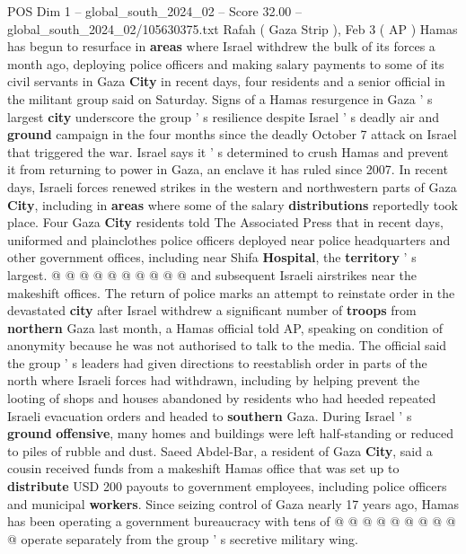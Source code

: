 \begin{textsample}{POS Dim 1 – global\_south\_2024\_02 – Score 32.00 – global\_south\_2024\_02/105630375.txt}  \label{ex:f1_pos_028}
Rafah ( Gaza Strip ), Feb 3 ( AP ) Hamas has begun to resurface in \textbf{areas} where Israel withdrew the bulk of its forces a month ago, deploying police officers and making salary payments to some of its civil servants in Gaza \textbf{City} in recent days, four residents and a senior official in the militant group said on Saturday.
Signs of a Hamas resurgence in Gaza ' s largest \textbf{city} underscore the group ' s resilience despite Israel ' s deadly air and \textbf{ground} campaign in the four months since the deadly October 7 attack on Israel that triggered the war.
Israel says it ' s determined to crush Hamas and prevent it from returning to power in Gaza, an enclave it has ruled since 2007.
In recent days, Israeli forces renewed strikes in the western and northwestern parts of Gaza \textbf{City}, including in \textbf{areas} where some of the salary \textbf{distributions} reportedly took place.
Four Gaza \textbf{City} residents told The Associated Press that in recent days, uniformed and plainclothes police officers deployed near police headquarters and other government offices, including near Shifa \textbf{Hospital}, the \textbf{territory} ' s largest. @ @ @ @ @ @ @ @ @ @ and subsequent Israeli airstrikes near the makeshift offices.
The return of police marks an attempt to reinstate order in the devastated \textbf{city} after Israel withdrew a significant number of \textbf{troops} from \textbf{northern} Gaza last month, a Hamas official told AP, speaking on condition of anonymity because he was not authorised to talk to the media.
The official said the group ' s leaders had given directions to reestablish order in parts of the north where Israeli forces had withdrawn, including by helping prevent the looting of shops and houses abandoned by residents who had heeded repeated Israeli evacuation orders and headed to \textbf{southern} Gaza.
During Israel ' s \textbf{ground} \textbf{offensive}, many homes and buildings were left half-standing or reduced to piles of rubble and dust.
Saeed Abdel-Bar, a resident of Gaza \textbf{City}, said a cousin received funds from a makeshift Hamas office that was set up to \textbf{distribute} USD 200 payouts to government employees, including police officers and municipal \textbf{workers}.
Since seizing control of Gaza nearly 17 years ago, Hamas has been operating a government bureaucracy with tens of @ @ @ @ @ @ @ @ @ @ operate separately from the group ' s secretive military wing.

\end{textsample}
